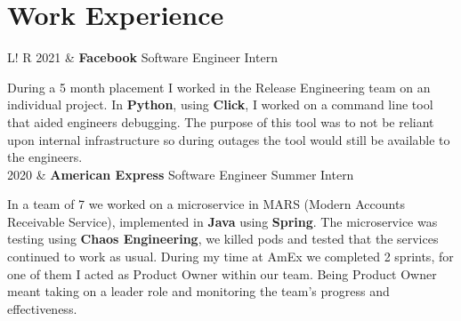 \documentclass[10pt, a4paper]{article}
\newcommand\vsep{\color{lightgray} \vrule width 0.5pt}
\newcommand\sect[1]{\section*{\hspace{.05cm} \Large\sc #1}}
\newcommand\tspace{\hfill}
\begin{document}
        \sect{Work Experience}
            \begin{tabular}{L!{\vsep}R}
                2021 & {\textbf{Facebook}} \tspace Software Engineer Intern
                    \smallskip

                    During a 5 month placement I worked in the Release Engineering team on an individual project. In \textbf{Python}, using \textbf{Click}, I worked on a command line tool that aided engineers debugging. The purpose of this tool was to not be reliant upon internal infrastructure so during outages the tool would still be available to the engineers. 
                \\
                2020 & {\textbf{American Express}} \tspace Software Engineer Summer Intern 
                    \smallskip

                    In a team of 7 we worked on a microservice in MARS (Modern Accounts Receivable Service), implemented in \textbf{Java} using \textbf{Spring}. The microservice was testing using \textbf{Chaos Engineering}, we killed pods and tested that the services continued to work as usual. During my time at AmEx we completed 2 sprints, for one of them I acted as Product Owner within our team. Being Product Owner meant taking on a leader role and monitoring the team's progress and effectiveness. 
                    \smallskip
            \end{tabular}
            \vspace{0.5\baselineskip}
\end{document}
